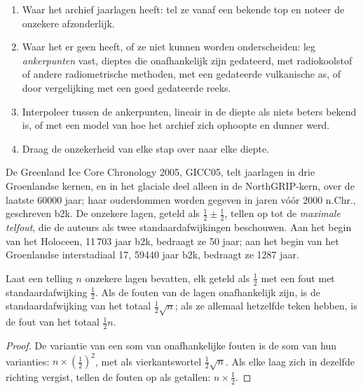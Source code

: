 \begin{method}\label{met:b2:climate-proxies:age-model}
\begin{enumerate}
  \item Waar het archief jaarlagen heeft: tel ze vanaf een bekende top en noteer de onzekere
        afzonderlijk.
  \item Waar het er geen heeft, of ze niet kunnen worden onderscheiden: leg \emph{ankerpunten} vast, dieptes die
        onafhankelijk zijn gedateerd, met radiokoolstof of andere radiometrische methoden, met een gedateerde vulkanische as, of door
        vergelijking met een goed gedateerde reeks.
  \item Interpoleer tussen de ankerpunten, lineair in de diepte als niets beters bekend is, of met een
        model van hoe het archief zich ophoopte en dunner werd.
  \item Draag de onzekerheid van elke stap over naar elke diepte.
\end{enumerate}
\end{method}

De Greenland Ice Core Chronology 2005, GICC05, telt jaarlagen in drie Groenlandse kernen, en
in het glaciale deel alleen in de NorthGRIP-kern, over de laatste \num{60000} jaar; haar ouderdommen worden
gegeven in jaren vóór 2000 n.Chr., geschreven b2k. De onzekere lagen, geteld als $\frac12 \pm \frac12$,
tellen op tot de \emph{maximale telfout}, die de auteurs als twee standaardafwijkingen beschouwen.
Aan het begin van het Holoceen, 11\,703 jaar b2k, bedraagt ze 50 jaar; aan het begin van het
Groenlandse interstadiaal 17, \num{59440} jaar b2k, bedraagt ze \num{1287} jaar.

\begin{proposition}\label{prop:b2:climate-proxies:counting}
Laat een telling $n$ onzekere lagen bevatten, elk geteld als $\frac12$ met een fout met
standaardafwijking $\frac12$. Als de fouten van de lagen onafhankelijk zijn, is de standaardafwijking van het
totaal $\frac12\sqrt{n}$; als ze allemaal hetzelfde teken hebben, is de fout van het totaal
$\frac12 n$.
\end{proposition}

\begin{proof}
De variantie van een som van onafhankelijke fouten is de som van hun varianties: $n \times
(\frac12)^2$, met als vierkantswortel $\frac12\sqrt{n}$. Als elke laag zich in dezelfde richting vergist, tellen de
fouten op als getallen: $n \times \frac12$.
\end{proof}

